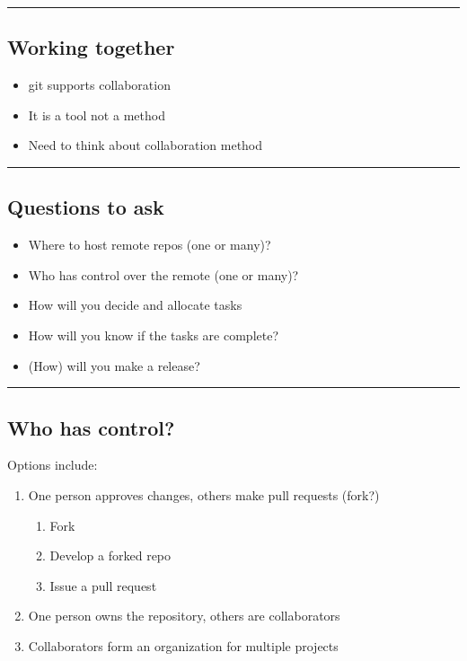 \documentclass{article}[18pt]
\providecommand{\tightlist}{%
  \setlength{\itemsep}{0pt}\setlength{\parskip}{0pt}}
\begin{document}
\begin{center}\rule{0.5\linewidth}{\linethickness}\end{center}

\hypertarget{working-together}{%
\subsection{Working together}\label{working-together}}

\begin{itemize}
\tightlist
\item
  git supports collaboration
\item
  It is a tool not a method
\item
  Need to think about collaboration method
\end{itemize}

\begin{center}\rule{0.5\linewidth}{\linethickness}\end{center}

\hypertarget{questions-to-ask}{%
\subsection{Questions to ask}\label{questions-to-ask}}
\begin{itemize}
\tightlist
\item Where to host remote repos (one or many)?
\item Who has control over the remote (one or many)?
\item How will you decide and allocate tasks 
\item How will you know if the tasks are complete?
\item (How) will you make a release? 
\end{itemize}
\begin{center}\rule{0.5\linewidth}{\linethickness}\end{center}

\hypertarget{who-has-control}{%
\subsection{Who has control?}\label{who-has-control}}

Options include:

\begin{enumerate}
\tightlist
\item
  One person approves changes, others make pull requests (fork?)
  \begin{enumerate}
  \item Fork
  \item Develop a forked repo
  \item Issue a pull request
  \end{enumerate}
\item
  One person owns the repository, others are collaborators
\item
  Collaborators form an organization for multiple projects
\end{enumerate}
\end{document}
